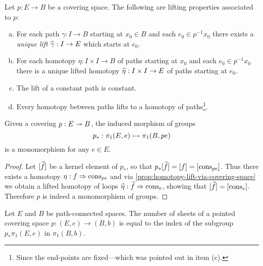 \begin{corollary}
\label{cor:lift-via-covering-space}
Let \(p: E \to B\) be a covering space. The following are lifting properties
associated to \(p\):
\begin{enumerate}[(a)]\setlength\itemsep{0em}
\item For each path \(\gamma: I \to B\) starting at \(x_0 \in B\) and each \(e_0
  \in p^{-1} x_0\) there exists a \emph{unique lift} \(\widehat \gamma: I \to E\)
  which starts at \(e_0\).

\item For each homotopy \(\eta: I \times I \to B\) of paths starting at \(x_0\)
  and each \(e_0 \in p^{-1} x_0\) there is a unique lifted homotopy
  \(\widehat \eta: I \times I \to E\) of paths starting at \(e_0\).

\item The lift of a constant path is constant.

\item Every homotopy between paths lifts to a homotopy of paths\footnote{Since
    the end-points are fixed---which was pointed out in item (c).}.
\end{enumerate}
\end{corollary}

\begin{proposition}
\label{proposition:covering-induces-monomorphism-fundamental-grps}
Given a covering \(p: E \twoheadrightarrow B\), the induced morphism of groups
\[
p_{*}: \pi_1(E, e) \rightarrowtail \pi_1(B, p e)
\]
is a monomorphism for any \(e \in E\).
\end{proposition}

\begin{proof}
Let \([\widehat f]\) be a kernel element of \(p_{*}\), so that
\(p_{*}[\widehat f] = [f] = [\operatorname{cons}_{p e}]\). Thus there exists a homotopy
\(\eta: f \Rightarrow \operatorname{cons}_{p e}\) and via
\cref{prop:homotopy-lift-via-covering-space} we obtain a lifted homotopy of
loops \(\widehat\eta: \widehat f \Rightarrow \operatorname{cons}_e\), showing that
\([\widehat f] = [\operatorname{cons}_e]\). Therefore \(p\) is indeed a monomorphism of groups.
\end{proof}

\begin{proposition}
\label{prop:covering-space-n-of-sheets-is-index}
Let \(E\) and \(B\) be path-connected spaces. The number of sheets of a pointed
covering space \(p: (E, e) \to (B, b)\) is equal to the index of the subgroup
\(p_{*}\pi_1(E, e)\) in \(\pi_1(B, b)\).
\end{proposition}

